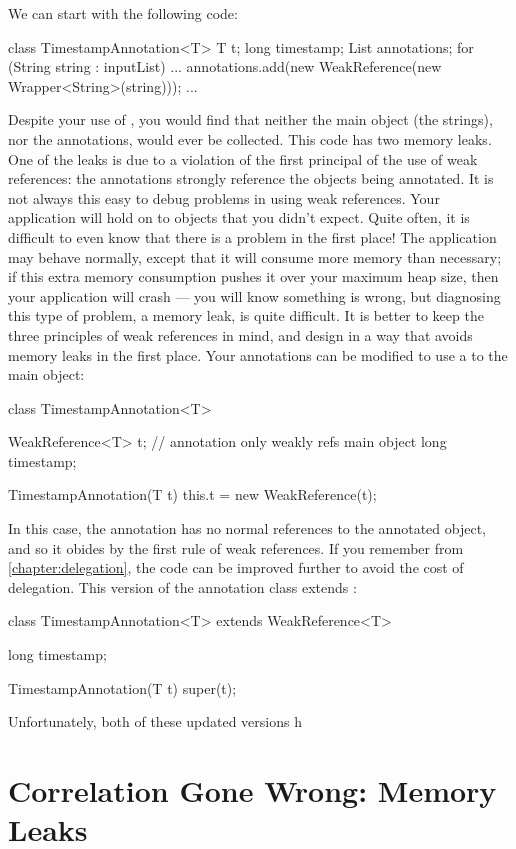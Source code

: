 We can start with the following code:

\begin{shortlisting}
class TimestampAnnotation<T> {
	T t;
	long timestamp;
}
List annotations;
for (String string : inputList) {
	...
	annotations.add(new WeakReference(new Wrapper<String>(string)));
	...
}
\end{shortlisting}

Despite your use of , you would find that neither the main
object (the strings), nor the annotations, would ever be collected. This code
has two memory leaks. One of the leaks is due to a
violation of the first principal of the use of weak references: the annotations
strongly reference the objects being annotated. It is not always this easy to
debug problems in using weak references. Your application will hold on to objects
that you didn't expect. Quite often, it is difficult to even know that there is a
problem in the first place! The application may behave normally, except that it
will consume more memory than necessary; if this extra memory consumption pushes
it over your maximum heap size, then your application will crash --- you will
know something is wrong, but diagnosing this type of problem, a memory
leak, is quite difficult. It is better to keep the
three principles of weak references in mind, and design in a way that avoids
memory leaks in the first place. Your annotations can be modified to use a
 to the main object:

\begin{shortlisting}
class TimestampAnnotation<T> {
	WeakReference<T> t; // annotation only weakly refs main object
	long timestamp;
	
	TimestampAnnotation(T t) {
		this.t = new WeakReference(t);
	}
}
\end{shortlisting}

In this case, the annotation has no normal references to the annotated object,
and so it obides by the first rule of weak references. If you remember from
\autoref{chapter:delegation}, the code can be improved further to avoid the cost
of delegation. This version of the annotation class extends
:

\begin{shortlisting}
class TimestampAnnotation<T> extends WeakReference<T> {
	long timestamp;
	
	TimestampAnnotation(T t) {
		super(t);
	}
}
\end{shortlisting}

Unfortunately, both of these updated versions h






\section{Correlation Gone Wrong: Memory Leaks}
